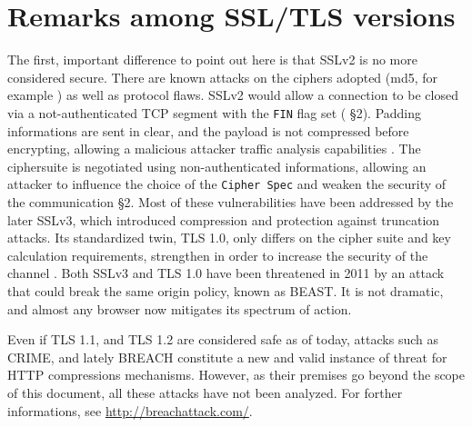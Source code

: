 \section{Remarks among SSL/TLS versions}

The first, important difference to point out here is that SSLv2 is no more
considered secure. There are known attacks on the ciphers adopted (md5, for
example \cite{rfc6176}) as well as protocol flaws.
SSLv2 would allow a connection to be closed via a not-authenticated TCP segment
with the \texttt{FIN} flag set (\cite{rfc6176} \S 2). Padding informations are sent in
clear, and the payload is not compressed before encrypting, allowing a malicious
attacker traffic analysis capabilities \cite{sslpadding}. The ciphersuite is negotiated using
non-authenticated informations, allowing an attacker to influence the choice of
the \texttt{Cipher Spec} and weaken the security of the communication
\cite{rfc6176} \S 2.
Most of these vulnerabilities have been addressed by the later SSLv3, which
introduced compression and protection against truncation attacks.
Its standardized twin, TLS 1.0, only differs on the cipher suite and key
calculation requirements, strengthen in order to increase the security of the
channel \cite{rfc2246}.
Both SSLv3 and TLS 1.0 have been threatened in 2011 by an attack that could break
the same origin policy, known as BEAST. It is not dramatic, and almost any
browser now mitigates its spectrum of action.

Even if TLS 1.1, and TLS 1.2 are considered safe as of today, attacks such as
CRIME, and lately BREACH constitute a new and valid instance of threat for HTTP
compressions mechanisms. However, as their premises go beyond the scope of this
document, all these attacks have not been analyzed. For forther informations, see
\url{http://breachattack.com/}.

